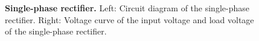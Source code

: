 {%


\begin{figure}[H]
    \renewcommand{\figurename}{Figure}
    \begin{minipage}[c]{0.4\textwidth}
        \centering
        
    \end{minipage}
    \begin{minipage}[c]{0.6\textwidth}
        \centering
        
    \end{minipage}
    \label{fig:Einweggleichrichter}
    \caption{\textbf{Single-phase rectifier.} Left: Circuit diagram of the single-phase rectifier.
        Right: Voltage curve of the input voltage and load voltage of the single-phase rectifier.}
\end{figure}
}

